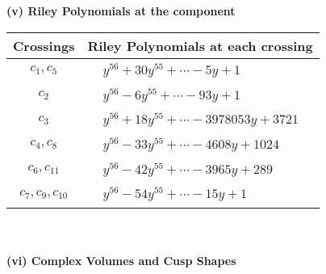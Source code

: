 \documentclass[1p]{elsarticle_modified}
\theoremstyle{definition}
\begin{document}
\newpage\renewcommand{\arraystretch}{1}
\flushleft \textbf{(v) Riley Polynomials at the component}\newline \\
\begin{tabular}{m{50pt}|m{274pt}}
Crossings & \hspace{64pt}Riley Polynomials at each crossing \\
\hline $$\begin{aligned}c_{1},c_{5}\end{aligned}$$&$\begin{aligned}
&y^{56}+30 y^{55}+\cdots-5 y+1
\end{aligned}$\\
\hline $$\begin{aligned}c_{2}\end{aligned}$$&$\begin{aligned}
&y^{56}-6 y^{55}+\cdots-93 y+1
\end{aligned}$\\
\hline $$\begin{aligned}c_{3}\end{aligned}$$&$\begin{aligned}
&y^{56}+18 y^{55}+\cdots-3978053 y+3721
\end{aligned}$\\
\hline $$\begin{aligned}c_{4},c_{8}\end{aligned}$$&$\begin{aligned}
&y^{56}-33 y^{55}+\cdots-4608 y+1024
\end{aligned}$\\
\hline $$\begin{aligned}c_{6},c_{11}\end{aligned}$$&$\begin{aligned}
&y^{56}-42 y^{55}+\cdots-3965 y+289
\end{aligned}$\\
\hline $$\begin{aligned}c_{7},c_{9},c_{10}\end{aligned}$$&$\begin{aligned}
&y^{56}-54 y^{55}+\cdots-15 y+1
\end{aligned}$\\
\hline
\end{tabular}\\~\\
\newpage\flushleft \textbf{(vi) Complex Volumes and Cusp Shapes}
\end{document}
